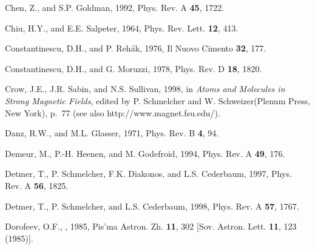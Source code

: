 \begin{references}

\harvarditem{}{}{}
Chen, Z., and S.P. Goldman, 1992, Phys. Rev. A {\bf 45}, 1722.

\harvarditem{}{}{}
Chiu, H.Y., and E.E. Salpeter, 1964, Phys. Rev. Lett. {\bf 12}, 413.


\harvarditem{}{}{}
Constantinescu, D.H., and P. Reh\'ak, 1976, Il Nuovo Cimento {\bf 32}, 177.

\harvarditem{}{}{}
Constantinescu, D.H., and G. Moruzzi, 1978, Phys. Rev. D {\bf 18}, 1820.

\harvarditem{}{}{}
Crow, J.E., J.R. Sabin, and N.S. Sullivan, 1998, in {\it Atoms and
Molecules in Strong Magnetic Fields}, edited by P. Schmelcher and 
W. Schweizer(Plenum Press, New York), p.~77 (see also 
http://www.magnet.fsu.edu/).

\harvarditem{}{}{}
Danz, R.W., and M.L. Glasser, 1971, Phys. Rev. B {\bf 4}, 94.

\harvarditem{}{}{}
Demeur, M., P.-H. Heenen, and M. Godefroid, 1994, Phys. Rev. A {\bf 49},
176.

\harvarditem{}{}{}
Detmer, T., P. Schmelcher, F.K. Diakonos, and L.S. Cederbaum, 1997, 
Phys. Rev. A {\bf 56}, 1825.

\harvarditem{}{}{}
Detmer, T., P. Schmelcher, and L.S. Cederbaum, 1998, Phys. Rev. A
{\bf 57}, 1767.

\harvarditem{}{}{}
Dorofeev, O.F., \etal, 1985, Pis'ma Astron. Zh. {\bf 11}, 302 
[Sov. Astron. Lett. {\bf 11}, 123 (1985)].


\end{references}
